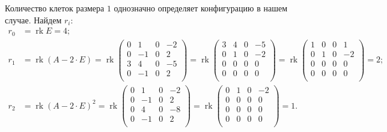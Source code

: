 \documentclass[a4paper]{article}
\newcommand{\rk}{\operatorname{rk}}
\begin{document}
\begin{solution}
\begin{options}
            Количество клеток размера $1$ однозначно определяет конфигурацию в нашем случае. Найдем $r_i$:
            \begin{align*}
                r_0 &= \rk E = 4; \\
                r_1 &= \rk(A - 2 \cdot E) = \rk \begin{pmatrix}
                    0 & 1 & 0 & -2 \\
                    0 & -1 & 0 & 2 \\
                    3 & 4 & 0 & -5 \\
                    0 & -1 & 0 & 2 \\
                \end{pmatrix}
                =
                \rk \begin{pmatrix}
                    3 & 4 & 0 & -5 \\
                    0 & 1 & 0 & -2 \\
                    0 & 0 & 0 & 0 \\
                    0 & 0 & 0 & 0 \\
                \end{pmatrix}
                =
                \rk \begin{pmatrix}
                    1 & 0 & 0 & 1 \\
                    0 & 1 & 0 & -2 \\
                    0 & 0 & 0 & 0 \\
                    0 & 0 & 0 & 0 \\
                \end{pmatrix}
                = 2; \\
                r_2 &= \rk (A - 2 \cdot E)^2
                =
                \rk \begin{pmatrix}
                    0 & 1 & 0 & -2 \\
                    0 & -1 & 0 & 2 \\
                    0 & 4 & 0 & -8 \\
                    0 & -1 & 0 & 2 \\
                \end{pmatrix}
                = \rk \begin{pmatrix}
                    0 & 1 & 0 & -2 \\
                    0 & 0 & 0 & 0 \\
                    0 & 0 & 0 & 0 \\
                    0 & 0 & 0 & 0 \\
                \end{pmatrix}
                = 1.
            \end{align*}


\end{options}
\end{solution}
\end{document}
